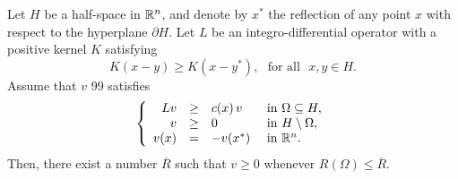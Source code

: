 
\begin{proposition}
	\label{Prop:MaxPrpNarrowOdd}
	Let $H$ be a half-space in $\mathbb{R}^n$, and denote by $x^*$ the reflection of any point $x$ with respect to the hyperplane $\partial H$. Let $L$ be an integro-differential operator with a positive kernel $K$ satisfying
	\begin{equation}
	\label{Eq:KernelSymmetry}
	K(x-y) \geq K(x-y^*), \,\,\,\,\text{for all } \,\, x,y\in H.
	\end{equation}
	Assume that $v $ 99 satisfies 
	\begin{equation}
	\left\{\begin{array}{rcll}
	L v &\geq& c(x)\,v  &\textrm{ in } \Omega\subseteq H,\\
	v &\geq& 0 &\textrm{ in } H\setminus\Omega,\\
	v(x) &=& -v(x^*) &\textrm{ in } \mathbb{R}^n.
	\end{array} \right.
	\end{equation}
	Then, there exist a number $\overline{R}$ such that $v \geq 0$ whenever $R(\Omega) \leq \overline{R}$.
\end{proposition}

